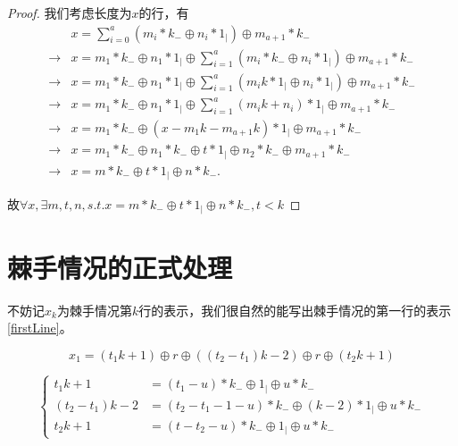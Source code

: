 \begin{proof}
    我们考虑长度为$x$的行，有
    $$
        \begin{aligned}
                        & x = \sum_{i=0}^{a} (m_i * k_{-} \oplus n_i * 1_{\vert}) \oplus m_{a+1} * k_{-}                                                \\
            \rightarrow & x = m_1 * k_{-} \oplus n_1 * 1_{\vert} \oplus \sum_{i=1}^{a} (m_i * k_{-} \oplus n_i * 1_{\vert})\oplus m_{a+1} * k_{-}       \\
            \rightarrow & x = m_1 * k_{-} \oplus n_1 * 1_{\vert} \oplus \sum_{i=1}^{a} (m_ik * 1_{\vert} \oplus n_i * 1_{\vert}) \oplus m_{a+1} * k_{-} \\
            \rightarrow & x = m_1 * k_{-} \oplus n_1 * 1_{\vert} \oplus \sum_{i=1}^{a} (m_ik + n_i) * 1_{\vert} \oplus m_{a+1} * k_{-}                  \\
            \rightarrow & x = m_1 * k_{-} \oplus (x - m_1k - m_{a+1}k) * 1_{\vert} \oplus m_{a+1} * k_{-}                                               \\
            \rightarrow & x = m_1 * k_{-} \oplus n_1 * k_{-} \oplus t * 1_{\vert} \oplus n_2 * k_{-} \oplus m_{a+1} * k_{-}                             \\
            \rightarrow & x = m * k_{-} \oplus t * 1_{\vert} \oplus n * k_{-}.
        \end{aligned}
    $$

    故$\forall x, \exists m, t, n, s.t. x = m * k_{-} \oplus t * 1_{\vert} \oplus n * k_{-}, t < k$
\end{proof}

\section{棘手情况的正式处理}

不妨记$x_k$为棘手情况第$k$行的表示，我们很自然的能写出棘手情况的第一行的表示\ref{firstLine}。

\begin{equation}
    x_1 = (t_1k + 1) \oplus r \oplus ((t_2 - t_1)k - 2) \oplus r \oplus  (t_2k + 1)
    \label{firstLine}
\end{equation}

$$
    \left\{
    \begin{aligned}
        t_1k + 1         & = (t_1 - u) * k_{-}  \oplus 1_{\vert} \oplus u * k_{-}                     \\
        (t_2 - t_1)k - 2 & = (t_2 - t_1 - 1 - u) * k_{-}  \oplus (k - 2) * 1_{\vert} \oplus u * k_{-} \\
        t_2k + 1         & = (t - t_2 - u) * k_{-}  \oplus 1_{\vert} \oplus u * k_{-}
        \label{first-difficult-sep}
    \end{aligned}
    \right.
$$


